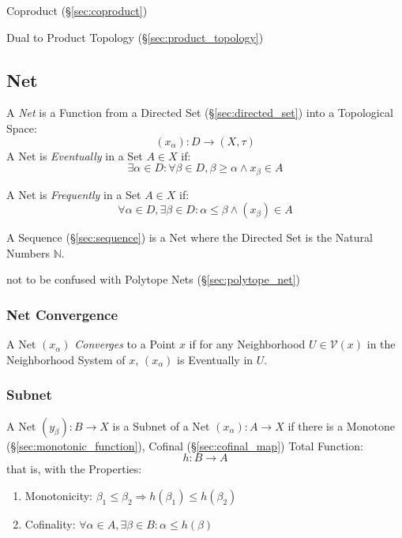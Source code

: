 Coproduct (\S\ref{sec:coproduct})

Dual to Product Topology (\S\ref{sec:product_topology})



\subsection{Net}\label{sec:net}

A \emph{Net} is a Function from a Directed Set (\S\ref{sec:directed_set}) into
a Topological Space:
\[
  (x_\alpha) : D \rightarrow (X, \tau)
\]
A Net is \emph{Eventually} in a Set $A \in X$ if:
\[
  \exists \alpha \in D
  : \forall \beta \in D, \beta \geq \alpha \wedge x_\beta \in A
\]

A Net is \emph{Frequently} in a Set $A \in X$ if:
\[
  \forall \alpha \in D, \exists \beta \in D
  : \alpha \leq \beta \wedge (x_\beta) \in A
\]

A Sequence (\S\ref{sec:sequence}) is a Net where the Directed Set is the
Natural Numbers $\mathbb{N}$.

\fist not to be confused with Polytope Nets (\S\ref{sec:polytope_net})



\subsubsection{Net Convergence}\label{sec:net_convergence}

A Net $(x_\alpha)$ \emph{Converges} to a Point $x$ if for any
Neighborhood $U \in \mathcal{V}(x)$ in the Neighborhood System of $x$,
$(x_\alpha)$ is Eventually in $U$.



\subsubsection{Subnet}\label{sec:subnet}

A Net $(y_\beta) : B \rightarrow X$ is a Subnet of a Net $(x_\alpha) :
A \rightarrow X$ if there is a Monotone
(\S\ref{sec:monotonic_function}), Cofinal (\S\ref{sec:cofinal_map})
Total Function:
\[
  h : B \rightarrow A
\]
that is, with the Properties:
\begin{enumerate}
  \item Monotonicity:
  $\beta_1 \leq \beta_2 \Rightarrow h(\beta_1) \leq h(\beta_2)$
  \item Cofinality:
   $\forall \alpha \in A, \exists \beta \in B : \alpha \leq h(\beta)$
\end{enumerate}



